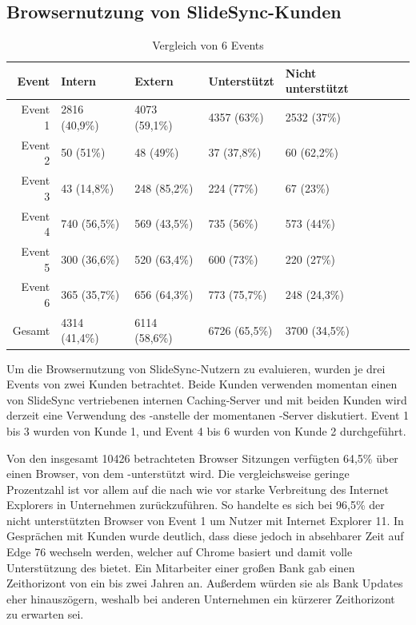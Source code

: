 \subsection{Browsernutzung von SlideSync-Kunden}\label{e:BrowserSS}

\begin{table}[!htb]\label{table-browser-slidesync}
\begin{center}

	\begin{tabular}{|r|l|l|l|l|l|l|}
		\hline
		Event	 & Intern 		& Extern 	& Unterstützt & Nicht unterstützt \\ \hline
		Event 1	 & 2816 (40,9\%)		& 4073 (59,1\%)		  	& 4357 (63\%)  & 2532 (37\%)			\\ \hline 
		Event 2	 & 50 (51\%)		& 48 (49\%)			 	& 37 (37,8\%) & 60 (62,2\%)		\\ \hline 
		Event 3	 & 43 (14,8\%)		& 248 (85,2\%)	  	& 224 (77\%)		  & 67 (23\%)		\\ \hline 
		Event 4	 & 740 (56,5\%)		& 569 (43,5\%)	  	& 735 (56\%)		  & 573 (44\%)		\\ \hline 
		Event 5	 & 300 (36,6\%)		& 520 (63,4\%)	  	& 600 (73\%)		  & 220 (27\%)		\\ \hline 
		Event 6	 & 365 (35,7\%)		& 656 (64,3\%)	  	& 773 (75,7\%)		  & 248 (24,3\%)		\\ \hline 
		Gesamt	 & 4314 (41,4\%)		& 6114 (58,6\%)	  	& 6726 (65,5\%)		  & 3700 (34,5\%)		\\ \hline 

	\end{tabular}
	\caption{Vergleich von 6 Events}
\end{center}
\end{table}

Um die Browsernutzung von SlideSync-Nutzern zu evaluieren, wurden je drei Events von zwei Kunden betrachtet. Beide Kunden verwenden momentan einen von SlideSync vertriebenen internen Caching-Server und mit beiden Kunden wird derzeit eine Verwendung des \pTp-\cdns anstelle der momentanen \cdn-Server diskutiert. Event 1 bis 3 wurden von Kunde 1, und Event 4 bis 6 wurden von Kunde 2 durchgeführt. 

 Von den insgesamt 10426 betrachteten Browser Sitzungen verfügten 64,5\% über einen Browser, von dem \pTp-\cdn unterstützt wird. Die vergleichsweise geringe Prozentzahl ist vor allem auf die nach wie vor starke Verbreitung des Internet Explorers in Unternehmen zurückzuführen. So handelte es sich bei 96,5\% der nicht unterstützten Browser von Event 1 um Nutzer mit Internet Explorer 11. In Gesprächen mit Kunden wurde deutlich, dass diese jedoch in absehbarer Zeit auf Edge 76 wechseln werden, welcher auf Chrome basiert und damit volle Unterstützung des \cdns bietet.\cite{edge-chrome} Ein Mitarbeiter einer großen Bank gab einen Zeithorizont von ein bis zwei Jahren an. Außerdem würden sie als Bank Updates eher hinauszögern, weshalb bei anderen Unternehmen ein kürzerer Zeithorizont zu erwarten sei.

